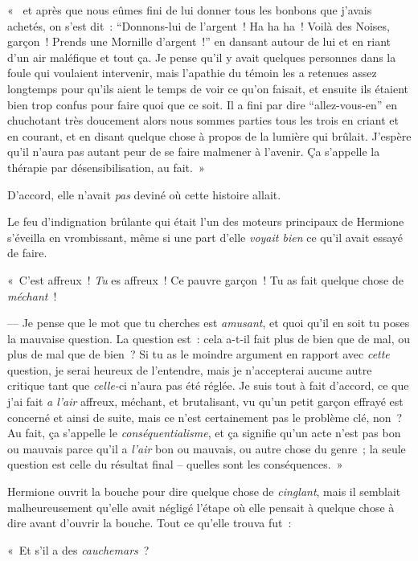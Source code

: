 «~ et après que nous eûmes fini de lui donner tous les bonbons que j'avais achetés, on s'est dit~: “Donnons-lui de l'argent~! Ha ha ha~! Voilà des Noises, garçon~! Prends une Mornille d'argent~!” en dansant autour de lui et en riant d'un air maléfique et tout ça. Je pense qu'il y avait quelques personnes dans la foule qui voulaient intervenir, mais l'apathie du témoin les a retenues assez longtemps pour qu'ils aient le temps de voir ce qu'on faisait, et ensuite ils étaient bien trop confus pour faire quoi que ce soit. Il a fini par dire “allez-vous-en” en chuchotant très doucement alors nous sommes parties tous les trois en criant et en courant, et en disant quelque chose à propos de la lumière qui brûlait. J'espère qu'il n'aura pas autant peur de se faire malmener à l'avenir. Ça s'appelle la thérapie par désensibilisation, au fait.~»

D'accord, elle n'avait \emph{pas} deviné où cette histoire allait.

Le feu d'indignation brûlante qui était l'un des moteurs principaux de Hermione s'éveilla en vrombissant, même si une part d'elle \emph{voyait bien} ce qu'il avait essayé de faire.

«~C'est affreux~! \emph{Tu} es affreux~! Ce pauvre garçon~! Tu as fait quelque chose de \emph{méchant}~!

--- Je pense que le mot que tu cherches est \emph{amusant}, et quoi qu'il en soit tu poses la mauvaise question. La question est~: cela a-t-il fait plus de bien que de mal, ou plus de mal que de bien~? Si tu as le moindre argument en rapport avec \emph{cette} question, je serai heureux de l'entendre, mais je n'accepterai aucune autre critique tant que \emph{celle-}ci n'aura pas été réglée. Je suis tout à fait d'accord, ce que j'ai fait \emph{a l'air} affreux, méchant, et brutalisant, vu qu'un petit garçon effrayé est concerné et ainsi de suite, mais ce n'est certainement pas le problème clé, non~? Au fait, ça s'appelle le \emph{conséquentialisme}, et ça signifie qu'un acte n'est pas bon ou mauvais parce qu'il a \emph{l'air} bon ou mauvais, ou autre chose du genre~; la seule question est celle du résultat final -- quelles sont les conséquences.~»

Hermione ouvrit la bouche pour dire quelque chose de \emph{cinglant}, mais il semblait malheureusement qu'elle avait négligé l'étape où elle pensait à quelque chose à dire avant d'ouvrir la bouche. Tout ce qu'elle trouva fut~:

«~Et s'il a des \emph{cauchemars}~?

